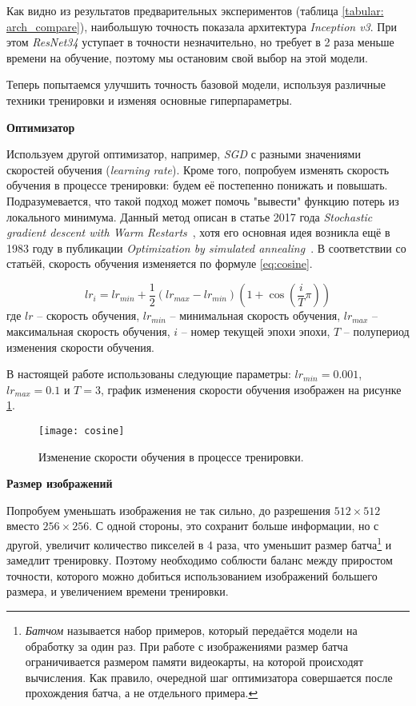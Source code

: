 \indent
\indent
Как видно из результатов предварительных экспериментов
(таблица \ref{tabular: arch_compare}), наибольшую
точность показала архитектура \textit{Inception v3}. При этом 
\textit{ResNet34} уступает в точности незначительно, но требует
в 2 раза меньше времени на обучение, поэтому мы остановим свой
выбор на этой модели. 


Теперь попытаемся улучшить точность базовой модели,
используя различные техники тренировки и изменяя основные гиперпараметры.

\indent
\textbf{Оптимизатор}

\indent
Используем другой оптимизатор, например, \textit{SGD} с 
разными значениями скоростей обучения (\textit{learning rate}).
Кроме того, попробуем изменять скорость обучения в процессе тренировки:
будем её постепенно понижать и повышать.
Подразумевается, что такой подход может
помочь "вывести" функцию потерь из локального минимума. Данный
метод описан в статье 2017 года
\textit{Stochastic gradient descent with Warm Restarts}~\cite{cosine},
хотя его основная идея возникла ещё в 1983 году в публикации
\textit{Optimization by simulated annealing}~\cite{annealing}. В соответствии со
статьёй, скорость обучения изменяется по формуле \ref{eq:cosine}.

\begin{equation}\label{eq:cosine}
    lr_i = lr_{min} + \frac{1}{2} (lr_{max} - lr_{min}) (1 + \cos(\frac{i}{T} \pi ))
\end{equation}
где $lr$ -- скорость обучения,
$lr_{min}$ -- минимальная скорость обучения,
$lr_{max}$ -- максимальная скорость обучения,
$i$ -- номер текущей эпохи эпохи,
$T$ -- полупериод изменения скорости обучения. 

\indent
В настоящей работе использованы следующие параметры:
$lr_{min} = 0.001$, $lr_{max} = 0.1$ и $T = 3$, график изменения
скорости обучения изображен на рисунке \ref{tikzpicture: cosine}.

\begin{figure}[h!]
    \begin{center}
   	    \texttt{[image: cosine]}
   	\end{center}
   	\caption{Изменение скорости обучения в процессе тренировки.}
   	\label{tikzpicture: cosine}
\end{figure}


\indent
\textbf{Размер изображений}

\indent
Попробуем уменьшать изображения не так сильно, 
до разрешения $512 \times 512$ вместо $256 \times 256 $.
С одной стороны, это сохранит больше информации, но с другой, увеличит 
количество пикселей в 4 раза, что уменьшит размер
батча\footnote{\textit{Батчом} называется набор примеров, который передаётся
модели на обработку за один раз. При работе с изображениями размер батча 
ограничивается размером памяти видеокарты, на которой происходят вычисления.
Как правило, очередной шаг оптимизатора совершается после
прохождения батча, а не отдельного примера.}
и замедлит тренировку.
Поэтому необходимо соблюсти баланс между приростом точности,
которого можно добиться использованием изображений большего размера,
и увеличением времени тренировки.

